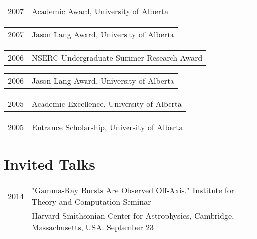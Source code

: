 \documentclass[letterpaper]{article}
\renewenvironment{itemize}{
  \begin{list}{}{
    \setlength{\leftmargin}{1.5em}
  }
}{
  \end{list}
}
\begin{document}
\begin{itemize}
\item \begin{tabular}{ll}
2007 & Academic Award, University of Alberta
\end{tabular}

\item \begin{tabular}{ll}
2007 & Jason Lang Award, University of Alberta
\end{tabular}

\item \begin{tabular}{ll}
2006 & NSERC Undergraduate Summer Research Award
\end{tabular}

\item \begin{tabular}{ll}
2006 & Jason Lang Award, University of Alberta
\end{tabular}

\item \begin{tabular}{ll}
2005 & Academic Excellence, University of Alberta
\end{tabular}

\item \begin{tabular}{ll}
2005 & Entrance Scholarship, University of Alberta
\end{tabular}

\end{itemize}

\section*{Invited Talks}
\begin{itemize}
\item \begin{tabular}{ll}
2014 & "Gamma-Ray Bursts Are Observed Off-Axis." Institute for Theory and Computation Seminar  \\
	& Harvard-Smithsonian Center for Astrophysics, Cambridge, Massachusetts, USA.  September 23
\end{tabular}
\end{itemize}

\end{document}
